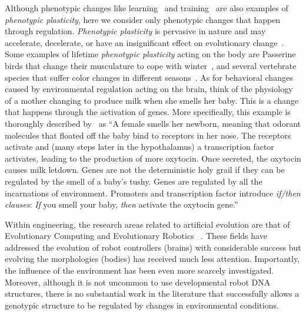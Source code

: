 \documentclass[utf8]{frontiersSCNS} %
\begin{document}
Although phenotypic changes like learning~\citep{fusco2010phenotypic} and training~\citep{kelly2011phenotypic} are also examples of \textit{phenotypic plasticity}, here we consider only phenotypic changes that happen through regulation. \textit{Phenotypic plasticity} is pervasive in nature and may accelerate, decelerate, or have an insignificant effect on evolutionary change~\citep{price2003role}. Some examples of lifetime \textit{phenotypic plasticity} acting on the body are Passerine birds that change their musculature to cope with winter~\citep{liknes2011phenotypic}, and several vertebrate species that suffer color changes in different seasons~\citep{mills2018winter}. As for behavioral changes caused by environmental regulation acting on the brain, think of the physiology of a mother changing to produce milk when she smells her baby. This is a change that happens through the activation of genes. More specifically, this example is thoroughly described by~\citet{sapolsky2017behave} as ``A female smells her newborn, meaning that odorant molecules that floated off the baby bind to receptors in her nose. The receptors activate and (many steps later in the hypothalamus) a transcription factor activates, leading to the production of more oxytocin. Once secreted, the oxytocin causes milk letdown. Genes are not the deterministic holy grail if they can be regulated by the smell of a baby’s tushy. Genes are regulated by all the incarnations of environment. Promoters and transcription factor introduce \textit{if/then clauses}: \textit{If} you smell your baby, \textit{then} activate the oxytocin gene.''


Within engineering, the research areas related to artificial evolution are that of Evolutionary Computing \citep{eiben2003introduction, eiben2015evolutionary} and Evolutionary Robotics ~\citep{nolfi2000evolutionary, nolfi2016evolutionary, doncieux2015evolutionary}. These fields have addressed the evolution of robot controllers (brains) with considerable success but evolving the morphologies (bodies) has received much less attention. Importantly, the influence of the environment has been even more scarcely investigated. Moreover, although it is not uncommon to use developmental robot DNA structures, there is no substantial work in the literature that successfully allows a genotypic structure to be regulated by changes in environmental conditions.
\end{document}
